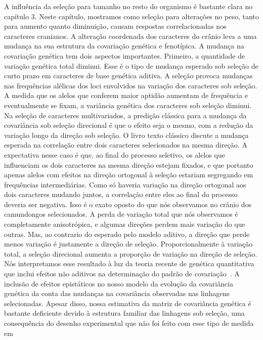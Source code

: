 \begin{refsection}
A influência da seleção para tamanho no resto do organismo é bastante clara no
capítulo 3. Neste capítulo, mostramos como seleção para alterações no peso,
tanto para aumento quanto diminuição, causam respostas correlacionadas nos
caracteres cranianos. A alteração coordenada dos caracteres do crânio leva a
uma mudança na sua estrutura da covariação genética e fenotípica. A mudança na
covariação genética tem dois aspectos importantes. Primeiro, a quantidade de
variação genética total diminui. Esse é o tipo de mudança esperado sob seleção
de curto prazo em caracteres de base genética aditiva. A seleção provoca
mudanças nas frequências alélicas dos loci envolvidos na variação dos
caracteres sob seleção. A medida que os alelos que conferem maior aptidão
aumentam de frequência e eventualmente se fixam, a variância genética dos
caracteres sob seleção diminui. Na seleção de caracteres multivariados, a
predição clássica para a mudança da covariância sob seleção direcional é que o
efeito seja o mesmo, com a redução da variação longo da direção sob seleção. O
livro texto clássico \textcite{Falconer1996-ot} discute a mudança esperada na
correlação entre dois caracteres selecionados na mesma direção. A expectativa
nesse caso é que, ao final do processo seletivo, os alelos que influenciam os
dois caracteres na mesma direção estejam fixados, e que portanto apenas alelos
com efeitos na direção ortogonal à seleção estariam segregando em frequências
intermediárias. Como só haveria variação na direção ortogonal aos dois
caracteres mudando juntos, a correlação entre eles ao final do processo
deveria ser negativa. Isso é o exato oposto do que nós observamos no crânio
dos camundongos selecionados. A perda de variação total que nós observamos é
completamente anisotrópica, e algumas direções perdem mais variação do que
outras. Mas, ao contrario do esperado pelo modelo aditivo, a direção que perde
menos variação é justamente a direção de seleção. Proporcionalmente à variação
total, a seleção direcional aumenta a proporção de variação na direção de
seleção. Nós interpretamos esse resultado à luz da teoria recente de genética
quantitativa que inclui efeitos não aditivos na determinação do padrão de
covariação~\parencite{Pavlicev2011-wz, Cheverud2001-ho}. A inclusão de efeitos
epistáticos no nosso modelo da evolução da covariância genética da conta das
mudanças na covariância observadas nas linhagens selecionadas. Apesar disso,
nossa estimativa da matriz de covariância genética é bastante deficiente
devido à estrutura familiar das linhagens sob seleção, uma consequência do
desenho experimental que não foi feito com esse tipo de medida em

\end{refsection}
